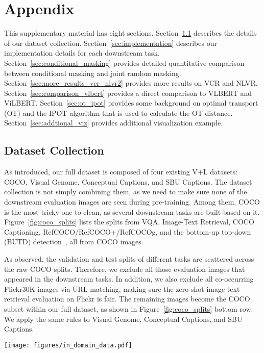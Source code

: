 \documentclass[runningheads]{llncs}
\begin{document}
\newpage
\appendix
\section{Appendix}

This supplementary material has eight sections. Section~\ref{sec:dataset_collection} describes the details of our dataset collection. Section~\ref{sec:implementation} describes our implementation details for each downstream task. Section~\ref{sec:conditional_masking} provides detailed quantitative comparison between conditional masking and joint random masking. Section~\ref{sec:more_results_vcr_nlvr2} provides more results on VCR and NLVR. Section~\ref{sec:comparison_vlbert} provides a direct comparison to VLBERT and ViLBERT. Section~\ref{sec:ot_ipot} provides some background on optimal transport (OT) and the IPOT algorithm that is used to calculate the OT distance. Section~\ref{sec:addtional_viz} provides additional visualization example.


\subsection{Dataset Collection} \label{sec:dataset_collection}
As introduced, our full dataset is composed of four existing V+L datasets: COCO,  Visual Genome, Conceptual Captions, and SBU Captions.
The dataset collection is not simply combining them, as we need to make sure none of the downstream evaluation images are seen during pre-training.
Among them, COCO is the most tricky one to clean, as several downstream tasks are built based on it.
Figure~\ref{fig:coco_splits} lists the splits from VQA, Image-Text Retrieval, COCO Captioning, RefCOCO/RefCOCO+/RefCOCOg, and the bottom-up top-down (BUTD) detection~\cite{anderson2018bottom}, all from COCO images.

As observed, the validation and test splits of different tasks are scattered across the raw COCO splits.
Therefore, we exclude all those evaluation images that appeared in the downstream tasks.
In addition, we also exclude all co-occurring Flickr30K images via URL matching, making sure the zero-shot image-text retrieval evaluation on Flickr is fair.
The remaining images become the COCO subset within our full dataset, as shown in Figure~\ref{fig:coco_splits} bottom row.
We apply the same rules to Visual Genome, Conceptual Captions, and SBU Captions.

\begin{figure*}[!h]
\centering
\texttt{[image: figures/in\_domain\_data.pdf]}
\caption{\small{Different data splits from downstream tasks based on COCO images. Our UNITER pre-training avoids seeing any downstream evaluation images}}
\label{fig:coco_splits}
\vspace{-10mm}
\end{figure*}
\end{document}
